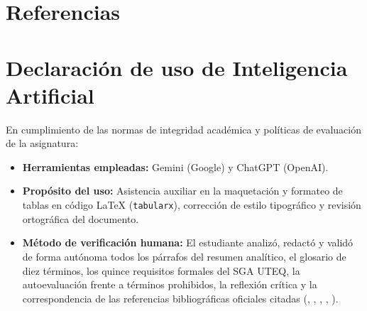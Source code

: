 \documentclass[conference]{IEEEtran}
\begin{document}
	\section{Referencias}
	\printbibliography[heading=none]
	
	\section*{Declaración de uso de Inteligencia Artificial}
	En cumplimiento de las normas de integridad académica y políticas de evaluación de la asignatura:
	\begin{itemize}[leftmargin=*,itemsep=2pt,topsep=2pt]
		\item \textbf{Herramientas empleadas:} Gemini (Google) y ChatGPT (OpenAI).
		\item \textbf{Propósito del uso:} Asistencia auxiliar en la maquetación y formateo de tablas en código \LaTeX{} (\texttt{tabularx}), corrección de estilo tipográfico y revisión ortográfica del documento.
		\item \textbf{Método de verificación humana:} El estudiante analizó, redactó y validó de forma autónoma todos los párrafos del resumen analítico, el glosario de diez términos, los quince requisitos formales del SGA UTEQ, la autoevaluación frente a términos prohibidos, la reflexión crítica y la correspondencia de las referencias bibliográficas oficiales citadas (\cite{ieee29148}, \cite{iso25010}, \cite{pohl2025}, \cite{swebok2024}, \cite{lopdp2021}).
	\end{itemize}
	
\end{document}
